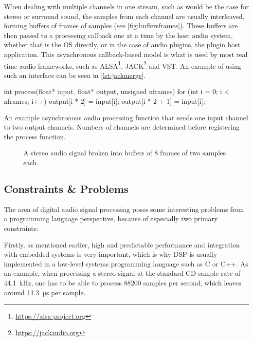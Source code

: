 When dealing with multiple channels in one stream, such as would be the case for stereo or surround sound,
the samples from each channel are usually interleaved, forming buffers of frames of samples (see
\autoref{fig:buffersframes}). These buffers are then passed to a processing callback one at a time by the host
audio system, whether that is the OS directly, or in the case of audio plugins, the plugin host application.
This asynchronous callback-based model is what is used by most real time audio frameworks, such as
ALSA\footnote{\url{https://alsa-project.org}}, JACK\footnote{\url{https://jackaudio.org}} and VST. An example of using such an interface can be
seen in \autoref{lst:jackmerge}.

\begin{listing}
  \begin{cppcodenl}
  int process(float* input, float* output, unsigned nframes) {
    for (int i = 0; i < nframes; i++) {
      output[i * 2] = input[i];
      output[i * 2 + 1] = input[i];
    }
  }
  \end{cppcodenl}
  \caption{An example asynchronous audio processing function that sends one input channel to two output channels.
    Numbers of channels are determined before registering the process function.
  }
  \label{lst:jackmerge}
\end{listing}

\begin{figure}
  
  \caption{A stereo audio signal broken into buffers of 8 frames of two samples each.}
  \label{fig:buffersframes}
\end{figure}

\subsection{Constraints \& Problems}

The area of digital audio signal processing poses some interesting problems from a programming language
perspective, because of especially two primary constraints:

Firstly, as mentioned earlier, high and predictable performance and integration with embedded systems is very
important, which is why DSP is usually implemented in a low-level systems programming language such as C or
C++. As an example, when processing a stereo signal at the standard CD sample rate of \SI{44.1}{kHz},
one has to be able to process \num{88200} samples per second, which leaves around
\SI{11.3}{\micro\second} per sample.

